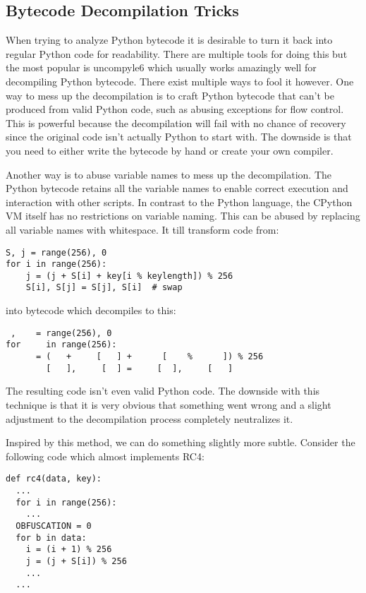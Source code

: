 \documentclass[twocolumn]{article}
\begin{document}
\subsection*{Bytecode Decompilation Tricks}

\vspace*{-0.3\baselineskip}


When trying to analyze Python bytecode it is desirable to turn it back into regular Python code for readability. There are multiple tools for doing this but the most popular is uncompyle6 which usually works amazingly well for decompiling Python bytecode. There exist multiple ways to fool it however. One way to mess up the decompilation is to craft Python bytecode that can't be produced from valid Python code, such as abusing exceptions for flow control. This is powerful because the decompilation will fail with no chance of recovery since the original code isn't actually Python to start with. The downside is that you need to either write the bytecode by hand or create your own compiler.

Another way is to abuse variable names to mess up the decompilation. The Python bytecode retains all the variable names to enable correct execution and interaction with other scripts. In contrast to the Python language, the CPython VM itself has no restrictions on variable naming. This can be abused by replacing all variable names with whitespace. It till transform code from:

\begin{verbatim}
S, j = range(256), 0
for i in range(256):
    j = (j + S[i] + key[i % keylength]) % 256
    S[i], S[j] = S[j], S[i]  # swap
\end{verbatim}

into bytecode which decompiles to this:

\begin{verbatim}
 ,    = range(256), 0
for     in range(256):
      = (   +     [   ] +      [    %      ]) % 256
        [   ],     [  ] =     [  ],     [   ]
\end{verbatim}

The resulting code isn't even valid Python code. The downside with this technique is that it is very obvious that something went wrong and a slight adjustment to the decompilation process completely neutralizes it. 

Inspired by this method, we can do something slightly more subtle. Consider the following code which almost implements RC4:

\begin{verbatim}
def rc4(data, key):
  ...
  for i in range(256):
    ...
  OBFUSCATION = 0
  for b in data:
    i = (i + 1) % 256
    j = (j + S[i]) % 256
    ...
  ...
\end{verbatim}
\end{document}
